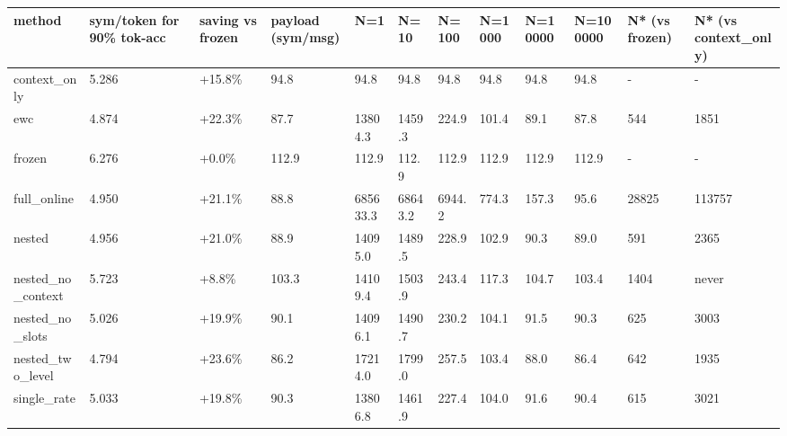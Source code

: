 \begin{tabular}{llllllllllll}
\hline
method & sym/token for 90\% tok-acc & saving vs frozen & payload (sym/msg) & N=1 & N=10 & N=100 & N=1000 & N=10000 & N=100000 & N* (vs frozen) & N* (vs context\_only) \\
\hline
context\_only & 5.286 & +15.8\% & 94.8 & 94.8 & 94.8 & 94.8 & 94.8 & 94.8 & 94.8 & - & - \\
ewc & 4.874 & +22.3\% & 87.7 & 13804.3 & 1459.3 & 224.9 & 101.4 & 89.1 & 87.8 & 544 & 1851 \\
frozen & 6.276 & +0.0\% & 112.9 & 112.9 & 112.9 & 112.9 & 112.9 & 112.9 & 112.9 & - & - \\
full\_online & 4.950 & +21.1\% & 88.8 & 685633.3 & 68643.2 & 6944.2 & 774.3 & 157.3 & 95.6 & 28825 & 113757 \\
nested & 4.956 & +21.0\% & 88.9 & 14095.0 & 1489.5 & 228.9 & 102.9 & 90.3 & 89.0 & 591 & 2365 \\
nested\_no\_context & 5.723 & +8.8\% & 103.3 & 14109.4 & 1503.9 & 243.4 & 117.3 & 104.7 & 103.4 & 1404 & never \\
nested\_no\_slots & 5.026 & +19.9\% & 90.1 & 14096.1 & 1490.7 & 230.2 & 104.1 & 91.5 & 90.3 & 625 & 3003 \\
nested\_two\_level & 4.794 & +23.6\% & 86.2 & 17214.0 & 1799.0 & 257.5 & 103.4 & 88.0 & 86.4 & 642 & 1935 \\
single\_rate & 5.033 & +19.8\% & 90.3 & 13806.8 & 1461.9 & 227.4 & 104.0 & 91.6 & 90.4 & 615 & 3021 \\
\hline
\end{tabular}
